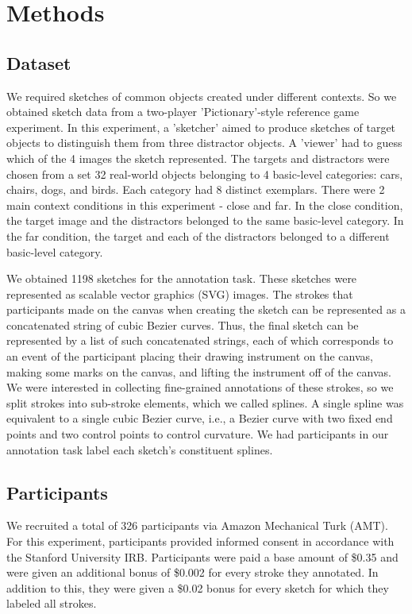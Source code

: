 \documentclass[10pt,letterpaper]{article}
\begin{document}
\section{Methods}

\subsection{Dataset}

We required sketches of common objects created under different contexts. 
So we obtained sketch data from a two-player 'Pictionary'-style reference game experiment. 
In this experiment, a 'sketcher' aimed to produce sketches of target objects to distinguish them from three distractor objects. 
A 'viewer' had to guess which of the 4 images the sketch represented. 
The targets and distractors were chosen from a set 32 real-world objects belonging to 4 basic-level categories: cars, chairs, dogs, and birds. 
Each category had 8 distinct exemplars. 
There were 2 main context conditions in this experiment - close and far. 
In the close condition, the target image and the distractors belonged to the same basic-level category. 
In the far condition, the target and each of the distractors belonged to a different basic-level category.

We obtained 1198 sketches for the annotation task. 
These sketches were represented as scalable vector graphics (SVG) images. 
The strokes that participants made on the canvas when creating the sketch can be represented as a concatenated string of cubic Bezier curves.  
Thus, the final sketch can be represented by a list of such concatenated strings, each of which corresponds to an event of the participant placing their drawing instrument on the canvas, making some marks on the canvas, and lifting the instrument off of the canvas. 
We were interested in collecting fine-grained annotations of these strokes, so we split strokes into sub-stroke elements, which we called splines. 
A single spline was equivalent to a single cubic Bezier curve, i.e., a Bezier curve with two fixed end points and two control points to control curvature. 
We had participants in our annotation task label each sketch's constituent splines.


\subsection{Participants}

We recruited a total of 326 participants via Amazon Mechanical Turk (AMT).  
For this experiment, participants provided informed consent in accordance with the Stanford University IRB. 
Participants were paid a base amount of \$0.35 and were given an additional bonus of \$0.002 for every stroke they annotated. 
In addition to this, they were given a \$0.02 bonus for every sketch for which they labeled all strokes. 
\end{document}
